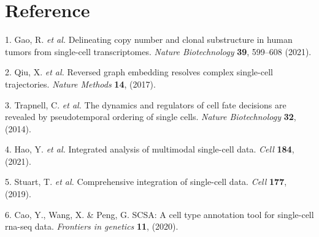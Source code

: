 \documentclass[
]{article}
\newenvironment{cslreferences}%
  {}%
  {\par}
\begin{document}
\hypertarget{bibliography}{%
\section*{Reference}\label{bibliography}}

\hypertarget{refs}{}
\begin{cslreferences}
\leavevmode\hypertarget{ref-DelineatingCopGaoR2021}{}%
1. Gao, R. \emph{et al.} Delineating copy number and clonal substructure in human tumors from single-cell transcriptomes. \emph{Nature Biotechnology} \textbf{39}, 599--608 (2021).

\leavevmode\hypertarget{ref-ReversedGraphQiuX2017}{}%
2. Qiu, X. \emph{et al.} Reversed graph embedding resolves complex single-cell trajectories. \emph{Nature Methods} \textbf{14}, (2017).

\leavevmode\hypertarget{ref-TheDynamicsAnTrapne2014}{}%
3. Trapnell, C. \emph{et al.} The dynamics and regulators of cell fate decisions are revealed by pseudotemporal ordering of single cells. \emph{Nature Biotechnology} \textbf{32}, (2014).

\leavevmode\hypertarget{ref-IntegratedAnalHaoY2021}{}%
4. Hao, Y. \emph{et al.} Integrated analysis of multimodal single-cell data. \emph{Cell} \textbf{184}, (2021).

\leavevmode\hypertarget{ref-ComprehensiveIStuart2019}{}%
5. Stuart, T. \emph{et al.} Comprehensive integration of single-cell data. \emph{Cell} \textbf{177}, (2019).

\leavevmode\hypertarget{ref-ScsaACellTyCaoY2020}{}%
6. Cao, Y., Wang, X. \& Peng, G. SCSA: A cell type annotation tool for single-cell rna-seq data. \emph{Frontiers in genetics} \textbf{11}, (2020).
\end{cslreferences}
\end{document}
